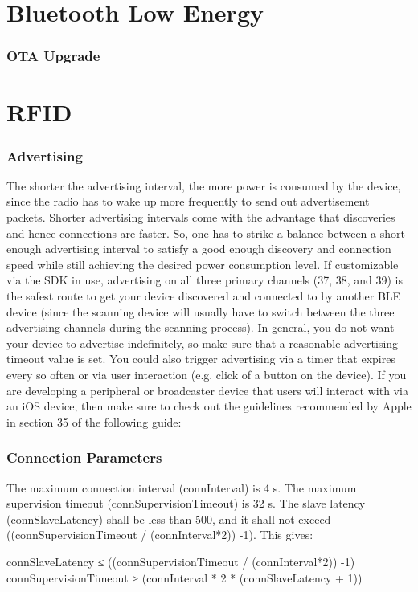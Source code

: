 \chapter{Bluetooth Low Energy}


\subsection{OTA Upgrade}


\chapter{RFID}



\subsection{Advertising}
The shorter the advertising interval, the more power is consumed by the device, since the radio has to wake up more frequently to send out advertisement packets.
Shorter advertising intervals come with the advantage that discoveries and hence connections are faster. So, one has to strike a balance between a short enough advertising interval to satisfy a good enough discovery and connection speed while still achieving the desired power consumption level.
If customizable via the SDK in use, advertising on all three primary channels (37, 38, and 39) is the safest route to get your device discovered and connected to by another BLE device (since the scanning device will usually have to switch between the three advertising channels during the scanning process).
In general, you do not want your device to advertise indefinitely, so make sure that a reasonable advertising timeout value is set. You could also trigger advertising via a timer that expires every so often or via user interaction (e.g. click of a button on the device).
If you are developing a peripheral or broadcaster device that users will interact with via an iOS device, then make sure to check out the guidelines recommended by Apple in section 35 of the following guide:






\subsection{Connection Parameters}
The maximum connection interval (connInterval) is 4 s.
The maximum supervision timeout (connSupervisionTimeout) is 32 s.
The slave latency (connSlaveLatency) shall be less than 500, and it shall not exceed ((connSupervisionTimeout / (connInterval*2)) -1).
This gives:

connSlaveLatency ≤ ((connSupervisionTimeout / (connInterval*2)) -1)
connSupervisionTimeout ≥ (connInterval * 2 * (connSlaveLatency + 1))

